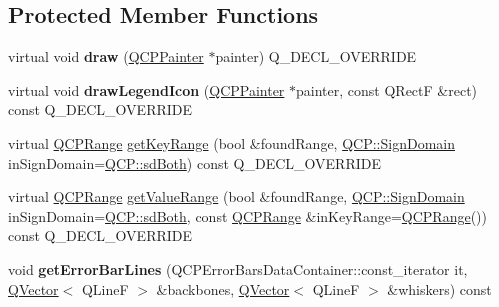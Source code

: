 \subsection*{Protected Member Functions}
\begin{DoxyCompactItemize}
\item 
virtual void {\bfseries draw} (\hyperlink{class_q_c_p_painter}{Q\+C\+P\+Painter} $\ast$painter) Q\+\_\+\+D\+E\+C\+L\+\_\+\+O\+V\+E\+R\+R\+I\+DE\hypertarget{class_q_c_p_error_bars_a801e85931372abf2a1034bfb2eac5cd2}{}\label{class_q_c_p_error_bars_a801e85931372abf2a1034bfb2eac5cd2}

\item 
virtual void {\bfseries draw\+Legend\+Icon} (\hyperlink{class_q_c_p_painter}{Q\+C\+P\+Painter} $\ast$painter, const Q\+RectF \&rect) const Q\+\_\+\+D\+E\+C\+L\+\_\+\+O\+V\+E\+R\+R\+I\+DE\hypertarget{class_q_c_p_error_bars_a20f5d292e66103f26bca00b11ce417b4}{}\label{class_q_c_p_error_bars_a20f5d292e66103f26bca00b11ce417b4}

\item 
virtual \hyperlink{class_q_c_p_range}{Q\+C\+P\+Range} \hyperlink{class_q_c_p_error_bars_a6cac828a430d66ac77a167549d01d212}{get\+Key\+Range} (bool \&found\+Range, \hyperlink{namespace_q_c_p_afd50e7cf431af385614987d8553ff8a9}{Q\+C\+P\+::\+Sign\+Domain} in\+Sign\+Domain=\hyperlink{namespace_q_c_p_afd50e7cf431af385614987d8553ff8a9a3dee7e9cd2fedce9253b83e172626a6c}{Q\+C\+P\+::sd\+Both}) const Q\+\_\+\+D\+E\+C\+L\+\_\+\+O\+V\+E\+R\+R\+I\+DE
\item 
virtual \hyperlink{class_q_c_p_range}{Q\+C\+P\+Range} \hyperlink{class_q_c_p_error_bars_ab76215a186ae4862235821e028685f26}{get\+Value\+Range} (bool \&found\+Range, \hyperlink{namespace_q_c_p_afd50e7cf431af385614987d8553ff8a9}{Q\+C\+P\+::\+Sign\+Domain} in\+Sign\+Domain=\hyperlink{namespace_q_c_p_afd50e7cf431af385614987d8553ff8a9a3dee7e9cd2fedce9253b83e172626a6c}{Q\+C\+P\+::sd\+Both}, const \hyperlink{class_q_c_p_range}{Q\+C\+P\+Range} \&in\+Key\+Range=\hyperlink{class_q_c_p_range}{Q\+C\+P\+Range}()) const Q\+\_\+\+D\+E\+C\+L\+\_\+\+O\+V\+E\+R\+R\+I\+DE
\item 
void {\bfseries get\+Error\+Bar\+Lines} (Q\+C\+P\+Error\+Bars\+Data\+Container\+::const\+\_\+iterator it, \hyperlink{class_q_vector}{Q\+Vector}$<$ Q\+LineF $>$ \&backbones, \hyperlink{class_q_vector}{Q\+Vector}$<$ Q\+LineF $>$ \&whiskers) const \hypertarget{class_q_c_p_error_bars_afafbd781f0e702a773524d7ee9220741}{}\label{class_q_c_p_error_bars_afafbd781f0e702a773524d7ee9220741}


\end{DoxyCompactItemize}
